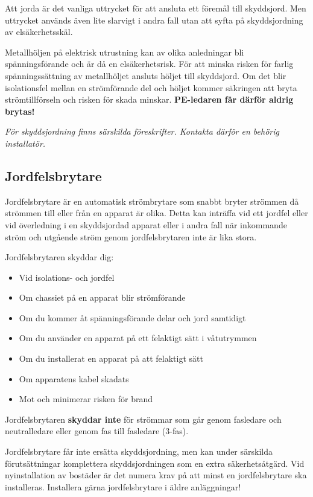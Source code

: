 Att jorda är det vanliga uttrycket för att ansluta ett föremål till
skyddsjord. Men uttrycket används även lite slarvigt i andra fall utan att
syfta på skyddsjordning av elsäkerhetsskäl.

Metallhöljen på elektrisk utrustning kan av olika anledningar bli
spänningsförande och är då en elsäkerhetsrisk. För att minska risken för
farlig spänningssättning av metallhöljet ansluts höljet till skyddsjord.
Om det blir isolationsfel mellan en strömförande del och höljet kommer
säkringen att bryta strömtillförseln och risken för skada minskar.
\textbf{PE-ledaren får därför aldrig brytas!}

\emph{För skyddsjordning finns särskilda föreskrifter. Kontakta därför en
behörig installatör.}

\subsection{Jordfelsbrytare}

Jordfelsbrytare är en automatisk strömbrytare som snabbt bryter strömmen
då strömmen till eller från en apparat är olika. Detta kan inträffa vid
ett jordfel eller vid överledning i en skyddsjordad apparat eller i andra
fall när inkommande ström och utgående ström genom jordfelsbrytaren inte
är lika stora.

Jordfelsbrytaren skyddar dig:
\begin{itemize}
\item Vid isolations- och jordfel
\item Om chassiet på en apparat blir strömförande
\item Om du kommer åt spänningsförande delar och jord samtidigt
\item Om du använder en apparat på ett felaktigt sätt i våtutrymmen
\item Om du installerat en apparat på att felaktigt sätt
\item Om apparatens kabel skadats
\item Mot och minimerar risken för brand
\end{itemize}

Jordfelsbrytaren \textbf{skyddar inte} för strömmar som går genom fasledare
och neutralledare eller genom fas till fasledare (3-fas).

Jordfelsbrytare får inte ersätta skyddsjordning, men kan under särskilda
förutsättningar komplettera skyddsjordningen som en extra säkerhetsåtgärd.
Vid nyinstallation av bostäder är det numera krav på att minst en
jordfelsbrytare ska installeras. Installera gärna jordfelsbrytare i äldre
anläggningar!

